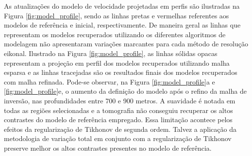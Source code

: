 As atualizações do modelo de velocidade projetadas em perfis são ilustradas na Figura \ref{fig:model_profile}, sendo as linhas pretas e vermelhas referentes aos modelos de referência e inicial, respectivamente. De maneira geral as linhas que representam os modelos recuperados utilizando os diferentes algoritmos de modelagem não apresentaram variações marcantes para cada método de resolução eikonal. Ilustrado na Figura \ref{fig:model_profile}, as linhas sólidas opacas representam a projeção em perfil dos modelos recuperados utilizando malha esparsa e as linhas tracejadas são os resultados finais dos modelos recuperados com malha refinada. Pode-se observar, na Figura \ref{fig:model_profile}a e \ref{fig:model_profile}e, o aumento da definição do modelo após o refino da malha de inversão, nas profundidades entre 700 e 900 metros. A suavidade é notada em todas as regiões selecionadas e a tomografia não conseguiu recuperar os altos contrastes do modelo de referência empregado. Essa limitação acontece pelos efeitos da regularização de Tikhonov de segunda ordem. Talvez a aplicação da metodologia de variação total em conjunto com a regularização de Tikhonov \cite{jiang20183d} preserve melhor os altos contrastes presentes no modelo de referência. 


